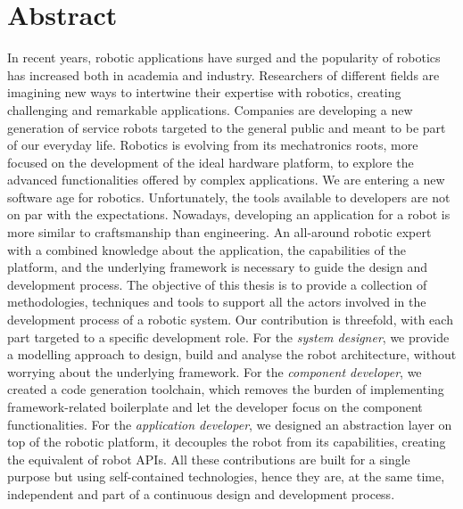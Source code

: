\begingroup
\let\clearpage\relax
\let\cleardoublepage\relax
\let\cleardoublepage\relax

\chapter*{Abstract}
In recent years, robotic applications have surged and the popularity of robotics has increased both in academia and industry. Researchers of different fields are imagining new ways to intertwine their expertise with robotics, creating challenging and remarkable applications. Companies are developing a new generation of service robots targeted to the general public and meant to be part of our everyday life. Robotics is evolving from its mechatronics roots, more focused on the development of the ideal hardware platform, to explore the advanced functionalities offered by complex applications. We are entering a new software age for robotics. Unfortunately, the tools available to developers are not on par with the expectations. Nowadays, developing an application for a robot is more similar to craftsmanship than engineering. An all-around robotic expert with a combined knowledge about the application, the capabilities of the platform, and the underlying framework is necessary to guide the design and development process. The objective of this thesis is to provide a collection of methodologies, techniques and tools to support all the actors involved in the development process of a robotic system. Our contribution is threefold, with each part targeted to a specific development role. For the \textit{system designer}, we provide a modelling approach to design, build and analyse the robot architecture, without worrying about the underlying framework. For the \textit{component developer}, we created a code generation toolchain, which removes the burden of implementing framework-related boilerplate and let the developer focus on the component functionalities. For the \textit{application developer}, we designed an abstraction layer on top of the robotic platform, it decouples the robot from its capabilities, creating the equivalent of robot APIs. All these contributions are built for a single purpose but using self-contained technologies, hence they are, at the same time, independent and part of a continuous design and development process.





\endgroup

\vfill
